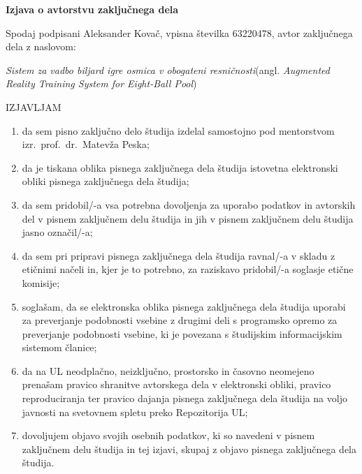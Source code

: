 \documentclass[a4paper, 12pt]{book}
\begin{document}

\pagestyle{empty}
\begin{center}
{\Large\textbf{\sc Izjava o avtorstvu zaključnega dela}}
\end{center}
%
\vspace{1mm}
\noindent Spodaj podpisani Aleksander Kovač, vpisna številka 63220478, avtor zaključnega dela z naslovom:

\vspace{1mm}
\noindent\emph{Sistem za vadbo biljard igre osmica v obogateni resničnosti}\hspace{5mm}(angl. \emph{Augmented Reality Training System for Eight-Ball Pool})

\vspace{1mm}
\begin{center}IZJAVLJAM\end{center}
\begin{enumerate}
\setlength\itemsep{0mm}
\item da sem pisno zaključno delo študija izdelal samostojno pod mentorstvom izr.\ prof.\ dr.\ Matevža Peska;
\item da je tiskana oblika pisnega zaključnega dela študija istovetna elektronski obliki pisnega zaključnega dela študija;
\item da sem pridobil/-a vsa potrebna dovoljenja za uporabo podatkov in avtorskih del v pisnem zaključnem delu študija in jih v pisnem zaključnem delu študija jasno označil/-a;
\item da sem pri pripravi pisnega zaključnega dela študija ravnal/-a v skladu z etičnimi načeli in, kjer je to potrebno, za raziskavo pridobil/-a soglasje etične komisije;
\item soglašam, da se elektronska oblika pisnega zaključnega dela študija uporabi za preverjanje podobnosti vsebine z drugimi deli s programsko opremo za preverjanje podobnosti vsebine, ki je povezana s študijskim informacijskim sistemom članice;
\item da na UL neodplačno, neizključno, prostorsko in časovno neomejeno prenašam pravico shranitve avtorskega dela v elektronski obliki, pravico reproduciranja ter pravico dajanja pisnega zaključnega dela študija na voljo javnosti na svetovnem spletu preko Repozitorija UL;
\item dovoljujem objavo svojih osebnih podatkov, ki so navedeni v pisnem zaključnem delu študija in tej izjavi, skupaj z objavo pisnega zaključnega dela študija.
\end{enumerate}
\end{document}
